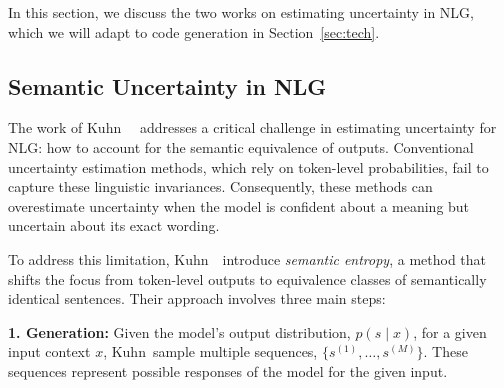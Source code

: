 In this section, we discuss the two works on estimating uncertainty in NLG, which we will adapt to code generation in Section~\ref{sec:tech}.


\subsection{Semantic Uncertainty in NLG}
\label{sec:background_SE}

The work of Kuhn~\etal~\cite{kuhnsemantic} addresses a critical challenge in estimating uncertainty for NLG: how to account for the semantic equivalence of outputs. 
Conventional uncertainty estimation methods, which rely on token-level probabilities, fail to capture these linguistic invariances. 
Consequently, these methods can overestimate uncertainty when the model is confident about a meaning but uncertain about its exact wording.

To address this limitation, Kuhn~\etal~introduce \emph{semantic entropy}, a method that shifts the focus from token-level outputs to equivalence classes of semantically identical sentences. 
Their approach involves three main steps:

    \noindent\textbf{1. Generation:} Given the model's output distribution, $p(s \mid x)$, for a given input context $x$,  Kuhn~\etal sample multiple sequences, $\{s^{(1)}, \ldots, s^{(M)}\}$. 
            These sequences represent possible responses of the model for the given input. 


